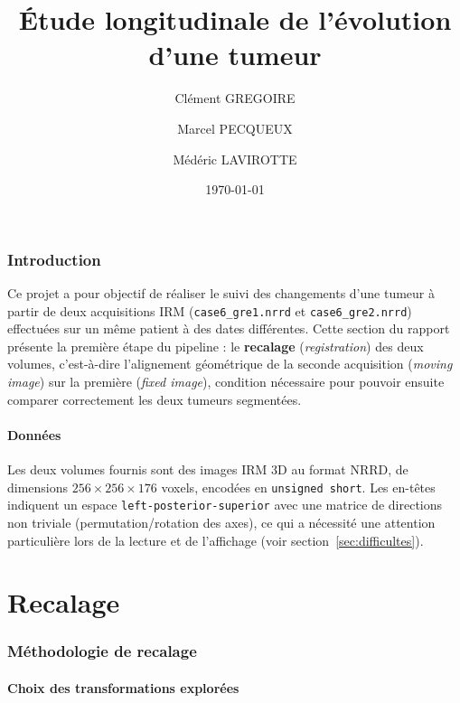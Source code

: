 \documentclass[11pt,a4paper]{article}
\title{Étude longitudinale de l'évolution d'une tumeur}
\author{
    Clément GREGOIRE \and Marcel PECQUEUX \and Médéric LAVIROTTE
}
\date{\today}
\begin{document}
\maketitle

\tableofcontents

\newpage

\section{Introduction}

Ce projet a pour objectif de réaliser le suivi des changements d'une tumeur à
partir de deux acquisitions IRM (\texttt{case6\_gre1.nrrd} et
\texttt{case6\_gre2.nrrd}) effectuées sur un même patient à des dates
différentes. Cette section du rapport présente la première étape du pipeline :
le \textbf{recalage} (\emph{registration}) des deux volumes, c'est-à-dire
l'alignement géométrique de la seconde acquisition (\emph{moving image}) sur
la première (\emph{fixed image}), condition nécessaire pour pouvoir ensuite
comparer correctement les deux tumeurs segmentées.


\subsection{Données}

Les deux volumes fournis sont des images IRM 3D au format NRRD, de dimensions
$256 \times 256 \times 176$ voxels, encodées en \texttt{unsigned short}. Les
en-têtes indiquent un espace \texttt{left-posterior-superior} avec une matrice
de directions non triviale (permutation/rotation des axes), ce qui a nécessité
une attention particulière lors de la lecture et de l'affichage (voir
section~\ref{sec:difficultes}).

\part {Recalage}
\section{Méthodologie de recalage}

\subsection{Choix des transformations explorées}
\end{document}
